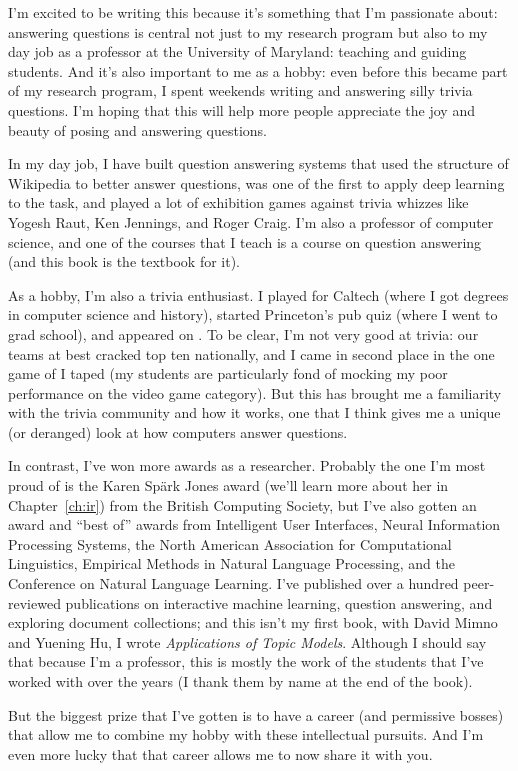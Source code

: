 
I’m excited to be writing this because it’s something that I’m 
passionate about: answering questions is central
not just to my research program but also to my day job as a professor
at the University of Maryland: teaching and guiding
students.  And it’s also important to me as a hobby: even before this became part
of my research program, I spent weekends writing and answering silly
trivia questions.  I’m hoping that this will help more people appreciate the
joy and beauty of posing and answering questions.

In my day job, I have built question answering systems that used the structure
of Wikipedia to better answer questions, was one of the first to apply deep
learning to the  task, and played a lot of exhibition games against
trivia whizzes like Yogesh Raut, Ken Jennings, and Roger Craig.  I'm also a
professor of computer science, and one of the courses that I teach is a
course on question answering (and this book is the textbook for it).

As a hobby, I'm also a trivia enthusiast.  I played \qb{} for Caltech (where I
got  degrees in computer science and history), started Princeton's pub
quiz (where I went to grad school), and appeared on \jeopardy{}.
%
To be clear, I'm not very good at trivia: our \qb{} teams at best cracked top
ten nationally, and I came in second place in the one game of \jeopardy{} I
taped (my students are particularly fond of mocking my poor performance on the
video game category).
%
But this has brought me a familiarity with the trivia community and how it
works, one that I think gives me a unique (or deranged) look at how computers
answer questions.

In contrast, I've won more awards as a researcher.
%
Probably the one I'm most proud of is the Karen Sp\"ark Jones award (we'll
learn more about her in Chapter~\ref{ch:ir}) from the British Computing Society,
but I've also gotten an  award and ``best of'' awards from Intelligent User
Interfaces, Neural Information Processing Systems, the North American
Association for Computational Linguistics, Empirical Methods in
Natural Language Processing, and the Conference on Natural
Language Learning.
%
I've published over a hundred peer-reviewed publications on interactive
machine learning, question answering, and exploring document collections; and
this isn't my first book, with David Mimno and Yuening Hu, I wrote
\emph{Applications of Topic Models}.
%
Although I should say that because I'm a professor, this is mostly the work of
the students that I've worked with over the years (I thank them by name at the
end of the book).

But the biggest prize that I've gotten is to have a career (and permissive
bosses) that allow me to combine my hobby with these intellectual pursuits.
%
And I'm even more lucky that that career allows me to now share it with you.


